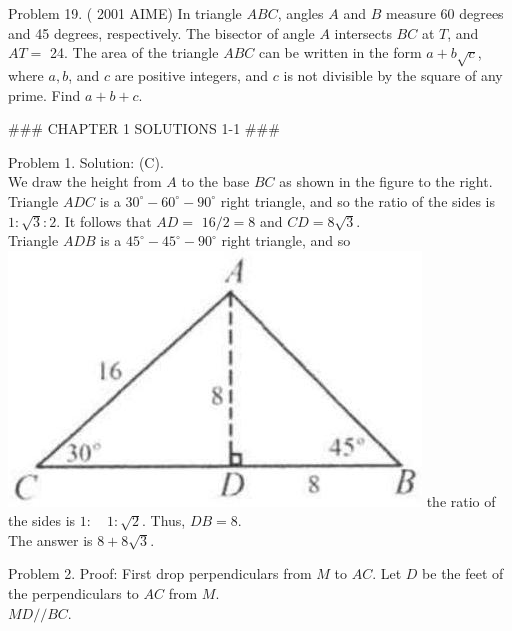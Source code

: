 \documentclass[10pt]{article}
\begin{document}
Problem 19. ( 2001 AIME) In triangle \(A B C\), angles \(A\) and \(B\) measure 60 degrees and 45 degrees, respectively. The bisector of angle \(A\) intersects \(B C\) at \(T\), and \(A T=\) 24. The area of the triangle \(A B C\) can be written in the form \(a+b \sqrt{c}\), where \(a, b\), and \(c\) are positive integers, and \(c\) is not divisible by the square of any prime. Find \(a+b+c\).


### CHAPTER 1 SOLUTIONS 1-1 ###

Problem 1. Solution: (C).\\
We draw the height from \(A\) to the base \(B C\) as shown in the figure to the right.\\
Triangle \(A D C\) is a \(30^{\circ}-60^{\circ}-90^{\circ}\) right triangle, and so the ratio of the sides is \(1: \sqrt{3}: 2\). It follows that \(A D=\) \(16 / 2=8\) and \(C D=8 \sqrt{3}\).\\
Triangle \(A D B\) is a \(45^{\circ}-45^{\circ}-90^{\circ}\) right triangle, and so\\
\includegraphics[max width=\textwidth]{2025_04_17_97bc1f7e44d93c271a88g-092} the ratio of the sides is \(1: \quad 1: \sqrt{2}\). Thus, \(D B=8\).\\
The answer is \(8+8 \sqrt{3}\).

Problem 2. Proof:
First drop perpendiculars from \(M\) to \(A C\). Let \(D\) be the feet of the perpendiculars to \(A C\) from \(M\).\\
\(M D / / B C\).
\end{document}
